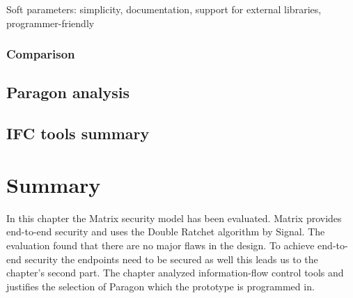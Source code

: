 Soft parameters: simplicity, documentation, support for external libraries, programmer-friendly




\subsubsection{Comparison}

\subsection{Paragon analysis}

\subsection{IFC tools summary}


\section{Summary}
In this chapter the Matrix security model has been evaluated. Matrix provides end-to-end security and uses the Double Ratchet algorithm by Signal. The evaluation found that there are no major flaws in the design. To achieve end-to-end security the endpoints need to be secured as well \cite{Sabelfeld2003} this leads us to the chapter's second part. The chapter analyzed information-flow control tools and justifies the selection of Paragon which the prototype is programmed in. 